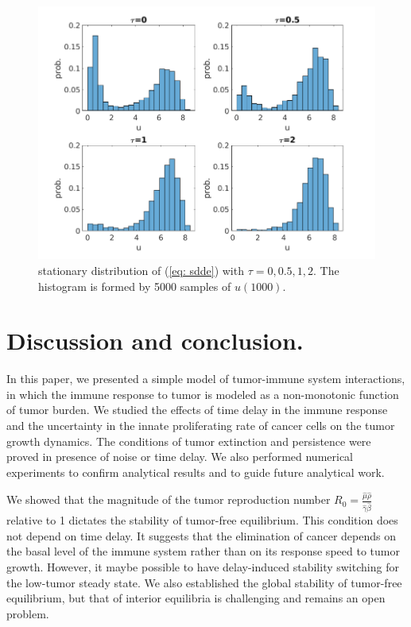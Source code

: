 \documentclass{aims}
\theoremstyle{definition}
\begin{document}
 \begin{figure}
 \includegraphics[scale=0.8]{explore/plots/statdist/statdist}
 
 \caption{\label{fig:statdistr}stationary distribution of (\ref{eq: sdde})
 with $\tau=0,0.5,1,2$. The histogram is formed by 5000 samples of
 $u(1000)$. }
 \end{figure}
 
 
 \section{Discussion and conclusion.}
 
 In this paper, we presented a simple model of tumor-immune system
 interactions, in which the immune response to tumor is modeled as
 a non-monotonic function of tumor burden. We studied the effects of
 time delay in the immune response and the uncertainty in the innate
 proliferating rate of cancer cells on the tumor growth dynamics. The
 conditions of tumor extinction and persistence were proved in presence
 of noise or time delay. We also performed numerical experiments to
 confirm analytical results and to guide future analytical work. 
 
 We showed that the magnitude of the tumor reproduction number $R_0=\frac{\hat{\mu}\hat{\rho}}{\hat{\gamma}\hat{\beta}}$
 relative to 1 dictates the stability of tumor-free equilibrium. This
 condition does not depend on time delay. It suggests that the elimination of cancer depends on the basal level of the immune system rather than on its response speed to tumor growth. However, it maybe possible to have delay-induced stability switching for the low-tumor steady state. 
 We also established the global stability of tumor-free equilibrium,
 but that of interior equilibria is challenging and remains an open
 problem. 
 
\end{document}
